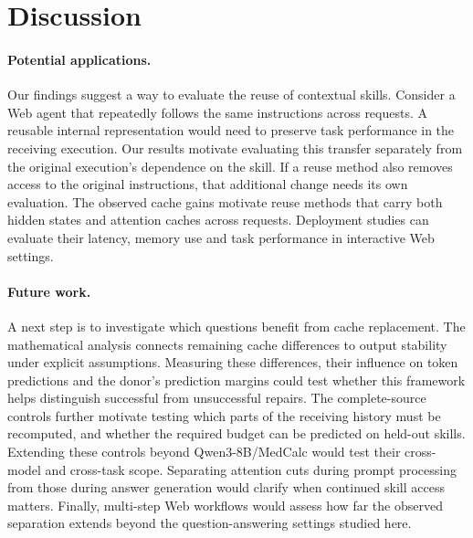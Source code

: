 \section{Discussion}
\label{sec:discussion}

\paragraph{Potential applications.}
Our findings suggest a way to evaluate the reuse of contextual skills.
Consider a Web agent that repeatedly follows the same instructions across
requests. A reusable internal representation would need to preserve task
performance in the receiving execution. Our results motivate evaluating
this transfer separately from the original execution's dependence on the
skill. If a reuse method also removes access to the original instructions,
that additional change needs its own evaluation. The observed cache gains
motivate reuse methods that carry both hidden states and attention caches
across requests. Deployment studies can evaluate their latency, memory
use and task performance in interactive Web settings.

\paragraph{Future work.}
A next step is to investigate which questions benefit from cache
replacement. The mathematical analysis connects remaining cache
differences to output stability under explicit assumptions. Measuring
these differences, their influence on token predictions and the donor's
prediction margins could test whether this framework helps distinguish
successful from unsuccessful repairs. The complete-source controls further motivate testing which parts of
the receiving history must be recomputed, and whether the required budget
can be predicted on held-out skills. Extending these controls beyond
Qwen3-8B/MedCalc would test their cross-model and cross-task scope. Separating attention cuts during prompt
processing from those during answer generation would clarify when continued
skill access matters. Finally,
multi-step Web workflows would assess how far the observed separation
extends beyond the question-answering settings studied here.
